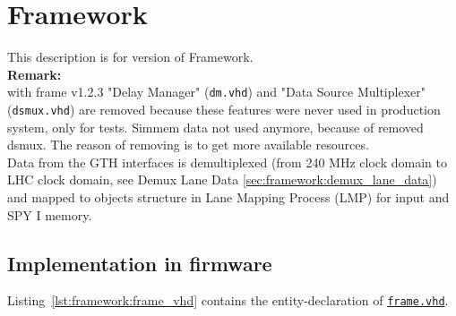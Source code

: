 \section{Framework}\label{sec:framework:framework}

This description is for version \versionframe of Framework.\\

\textbf{Remark:}\\
with frame v1.2.3 "Delay Manager" (\texttt{\textquotesingle dm.vhd\textquotesingle }) and "Data Source Multiplexer" (\texttt{\textquotesingle dsmux.vhd\textquotesingle }) are removed because these features were never used in production system, only for tests.
Simmem data not used anymore, because of removed dsmux.
The reason of removing is to get more available resources.\\

Data from the GTH interfaces is demultiplexed (from 240 MHz clock domain to LHC clock domain, see Demux Lane Data \ref{sec:framework:demux_lane_data}) and mapped to objects structure in Lane Mapping Process (LMP) for \ugtl input and SPY I memory.

\subsection{Implementation in firmware}
\label{sec:framework:implementation_firmware}

Listing~\ref{lst:framework:frame_vhd} contains the entity-declaration of \href{\gitbranch/firmware/hdl/payload/frame.vhd}{\texttt{\textquotesingle frame.vhd\textquotesingle }}.\\



\clearpage

